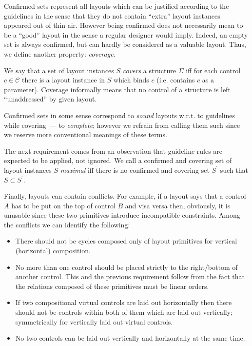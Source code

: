 Confirmed sets represent all layouts which can be justified according to the guidelines in the sense that they
do not contain ``extra'' layout instances appeared out of thin air. However being confirmed does not
necessarily mean to be a ``good'' layout in the sense a regular designer would imply. Indeed, an
empty set is always confirmed, but can hardly be considered as a valuable layout. Thus, we define
another property: \emph{coverage}.

We say that a set of layout instances $S$ \emph{covers} a structure $\Sigma$ iff for each control $c\in\mathcal{C}$
there is a layout instance in $S$ which binds $c$ (i.e. contains $c$ as a parameter). Coverage
informally means that no control of a structure is left ``unaddressed'' by given layout.

Confirmed sets in some sense correspond to \emph{sound} layouts w.r.t. to guidelines while covering~--- to
\emph{complete}; however we refrain from calling them such since we reserve more conventional meanings of these terms.

The next requirement comes from an observation that guideline rules are expected to be applied, not ignored. We
call a confirmed and covering set of layout instances $S$ \emph{maximal} iff there is no
confirmed and covering set $S^\prime$ such that $S\subset S^\prime$.

Finally, layouts can contain conflicts. For example, if a layout says that a control $A$ has to be put on
the top of control $B$ and visa versa then, obviously, it is unusable since these two primitives introduce
incompatible constraints. Among the conflicts we can identify the following:

\begin{itemize}
\item There should not be cycles composed only of layout primitives for vertical (horizontal) composition.
\item No more than one control should be placed strictly to the right/bottom of another control. This and the previous requirement follow from the fact that the relations composed of these primitives must be linear orders.
\item If two compositional virtual controls are laid out horizontally then there should not be
  controls within both of them which are laid out vertically; symmetrically for vertically
  laid out virtual controls.
\item No two controls can be laid out vertically and horizontally at the same time.
\end{itemize}

